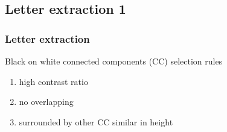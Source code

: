 \documentclass[9pt]{beamer}
\begin{document}
\begin{frame}
\begin{columns}[c]
		\end{columns}
		
		\end{frame}
		

	\subsection[Letter1]{Letter extraction 1}
		\begin{frame}
		\frametitle{Letter extraction}

			\begin{block}{Black on white connected components (CC) selection rules}
				\begin{enumerate}
					\item high contrast ratio
					\item no overlapping
					\item surrounded by other CC similar in height
				\end{enumerate}


\end{block}
\end{frame}
\end{document}
